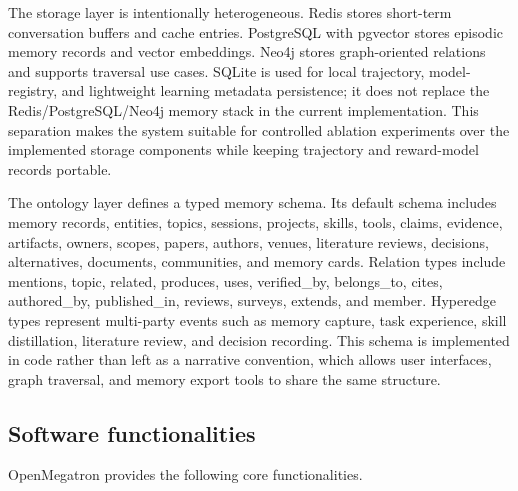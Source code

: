 \documentclass[preprint,12pt,a4paper]{elsarticle}
\begin{document}
The storage layer is intentionally heterogeneous. Redis stores short-term conversation buffers and cache entries. PostgreSQL with pgvector stores episodic memory records and vector embeddings. Neo4j stores graph-oriented relations and supports traversal use cases. SQLite is used for local trajectory, model-registry, and lightweight learning metadata persistence; it does not replace the Redis/PostgreSQL/Neo4j memory stack in the current implementation. This separation makes the system suitable for controlled ablation experiments over the implemented storage components while keeping trajectory and reward-model records portable.

The ontology layer defines a typed memory schema. Its default schema includes memory records, entities, topics, sessions, projects, skills, tools, claims, evidence, artifacts, owners, scopes, papers, authors, venues, literature reviews, decisions, alternatives, documents, communities, and memory cards. Relation types include mentions, topic, related, produces, uses, verified\_by, belongs\_to, cites, authored\_by, published\_in, reviews, surveys, extends, and member. Hyperedge types represent multi-party events such as memory capture, task experience, skill distillation, literature review, and decision recording. This schema is implemented in code rather than left as a narrative convention, which allows user interfaces, graph traversal, and memory export tools to share the same structure.

\subsection{Software functionalities}

OpenMegatron provides the following core functionalities.
\end{document}
